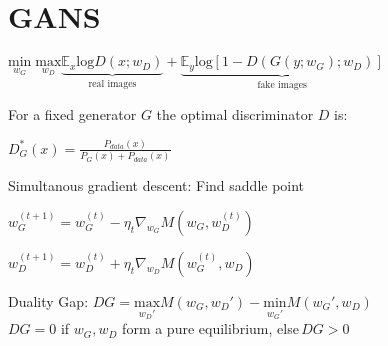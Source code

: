 

\section{GANS}
    \centerline{$\underset{w_G}{\mathrm{min}} \;\underset{w_D}{\mathrm{max}} \underbrace{\mathbb{E}_x\mathrm{log}D(x;w_D)}_{\text{real images}}+\underbrace{\mathbb{E}_y\mathrm{log}\left[1-D(G(y;w_G);w_D)\right]}_{\text{fake images}}$}
    For a fixed generator $G$ the optimal discriminator $D$ is: \centerline{$D_G^*(x) = \frac{P_{data}(x)}{P_G(x)+P_{data}(x)}$}
    
    Simultanous gradient descent: Find saddle point\\
    \centerline{$w_G^{(t+1)}= w_G^{(t)}-\eta_t\nabla_{w_G}M(w_G,w_D^{(t)})$}
    \centerline{$w_D^{(t+1)}= w_D^{(t)}+\eta_t\nabla_{w_D}M(w_G^{(t)},w_D)$}
    
    Duality Gap: $DG = \underset{w_D'}{\mathrm{max}}M(w_G,w_D')-\underset{w_G'}{\mathrm{min}}M(w_G',w_D)$\\
    $DG = 0$ if $w_G, w_D$ form a pure equilibrium, else\,$DG > 0$


